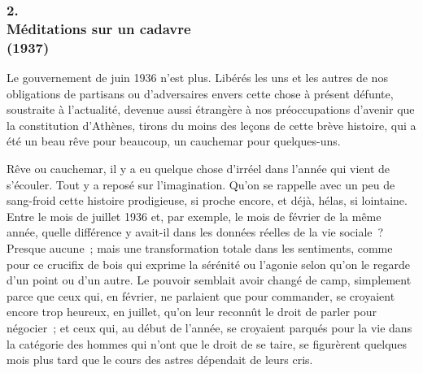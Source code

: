 \documentclass[french,twoside]{book} %
\begin{document}
\subsubsection[{2. Méditations sur un cadavre, (1937)}]{2. \\
Méditations sur un cadavre \\
(1937)}
\noindent \par
Le gouvernement de juin 1936 n'est plus. Libérés les uns et les autres de nos obligations de partisans ou d'adversaires envers cette chose à présent défunte, soustraite à l'actualité, devenue aussi étrangère à nos préoccupations d'avenir que la constitution d'Athènes, tirons du moins des leçons de cette brève histoire, qui a été un beau rêve pour beaucoup, un cauchemar pour quelques-uns.\par
Rêve ou cauchemar, il y a eu quelque chose d'irréel dans l'année qui vient de s'écouler. Tout y a reposé sur l'imagination. Qu'on se rappelle avec un peu de sang-froid cette histoire prodigieuse, si proche encore, et déjà, hélas, si lointaine. Entre le mois de juillet 1936 et, par exemple, le mois de février de la même année, quelle différence y avait-il dans les données réelles de la vie sociale ? Presque aucune ; mais une transformation totale dans les sentiments, comme pour ce crucifix de bois qui exprime la sérénité ou l'agonie selon qu'on le regarde d'un point ou d'un autre. Le pouvoir semblait avoir changé de camp, simplement parce que ceux qui, en février, ne parlaient que pour commander, se croyaient encore trop heureux, en juillet, qu'on leur reconnût le droit de parler pour négocier ; et ceux qui, au début de l'année, se croyaient parqués pour la vie dans la catégorie des hommes qui n'ont que le droit de se taire, se figurèrent quelques mois plus tard que le cours des astres dépendait de leurs cris.\par
\end{document}
